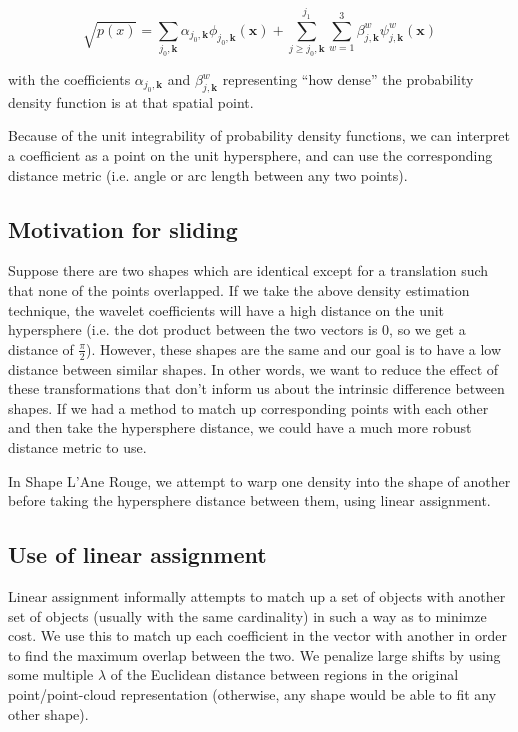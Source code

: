 \documentclass[../tech_report_1.tex]{subfiles}
\begin{document}
\begin{equation}
\sqrt{p(x)} = 
\sum_{j_0,\bm{k}}
	\alpha_{j_0,\bm{k}}
	\phi_{j_0,\bm{k}}(\bm{x})
+
\sum_{j\geq j_0, \bm{k}}^{j_1}
\sum_{w=1}^3
	\beta_{j,\bm{k}}^{w}
	\psi_{j,\bm{k}}^{w}(\bm{x})
\end{equation}

with the coefficients $\alpha_{j_0, \bm{k}}$ and $\beta_{j,\bm{k}}^w$ representing ``how dense'' the probability density function is at that spatial point.

Because of the unit integrability of probability density functions, we can interpret a coefficient as a point on the unit hypersphere, and can use the corresponding distance metric (i.e. angle or arc length between any two points).

\subsection{Motivation for sliding}

Suppose there are two shapes which are identical except for a translation such that none of the points overlapped.
If we take the above density estimation technique, the wavelet coefficients will have a high distance on the unit hypersphere (i.e. the dot product between the two vectors is 0, so we get a distance of $\frac{\pi}{2}$).
However, these shapes are the same and our goal is to have a low distance between similar shapes. In other words, we want to reduce the effect of these transformations that don't inform us about the intrinsic difference between shapes. If we had a method to match up corresponding points with each other and then take the hypersphere distance, we could have a much more robust distance metric to use.

In Shape L'Ane Rouge, we attempt to warp one density into the shape of another before taking the hypersphere distance between them, using linear assignment.

\subsection{Use of linear assignment}

Linear assignment informally attempts to match up a set of objects with another set of objects (usually with the same cardinality) in such a way as to minimze cost. We use this to match up each coefficient in the vector with another in order to find the maximum overlap between the two. We penalize large shifts by using some multiple $\lambda$ of the Euclidean distance between regions in the original point/point-cloud representation (otherwise, any shape would be able to fit any other shape).
\end{document}

